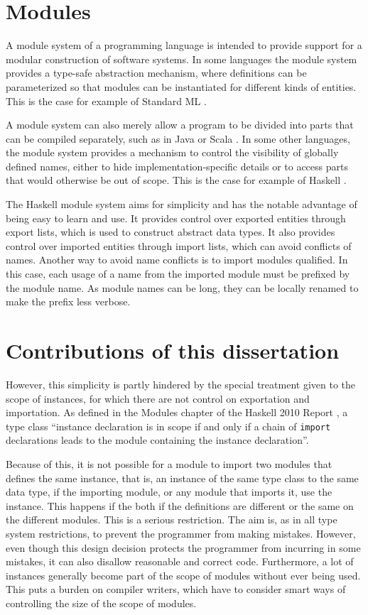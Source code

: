 \documentclass[msc]{ppgccufmg}
\begin{document}
\section{Modules}

A module system of a programming language is intended to provide
support for a modular construction of software systems.  In some
languages the module system provides a type-safe abstraction
mechanism, where definitions can be parameterized so that
modules can be instantiated for different kinds of
entities. This is the case for example of Standard ML \citep{sml}.

A module system can also merely allow a program to
be divided into parts that can be compiled separately, such as in Java \citep{java} or Scala \citep{scala}.
In some other
languages, the module system provides a mechanism to control the
visibility of globally defined names, either to hide
implementation-specific details or to access parts that would
otherwise be out of scope. This is the case for example of Haskell
\citep[chapter~5]{report}.

The Haskell module system aims for simplicity \citep[section~8.2]{history}
and has the notable advantage of being easy to learn and use.
It provides control over exported entities through export lists, which is used to construct abstract data types.
It also provides control over imported entities through import lists, which can avoid conflicts of names.
Another way to avoid name conflicts is to import modules qualified.
In this case, each usage of a name from the imported module must be prefixed by the module name.
As module names can be long, they can be locally renamed to make the prefix less verbose.

\section{Contributions of this dissertation}

However, this simplicity is partly hindered by the special treatment given to the scope of instances, for which there are not control on exportation and importation.
As defined in the Modules chapter of the Haskell 2010 Report \citep[section~5.4]{report}, a type class ``instance declaration is in scope if and only if a chain of \texttt{import} declarations leads to the module containing the instance declaration''.

Because of this, it is not possible for a module to import two modules that defines the same instance, that is, an instance of the same type class to the same data type, if the importing module, or any module that imports it, use the instance.  This happens if the both if the definitions are different or the same on the different modules.  This is a
serious
restriction. The aim is, as in all type system restrictions, to
prevent the programmer from making mistakes.  However, even though
this design decision protects the programmer from incurring in some
mistakes, it can also disallow reasonable and correct code.
Furthermore, a lot of instances generally become part of the scope of
modules without ever being used.  This puts a burden on compiler
writers, which have to consider smart ways of controlling the size of
the scope of modules.
\end{document}
